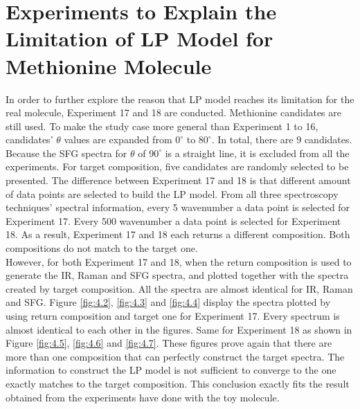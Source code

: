 
\section{Experiments to Explain the Limitation of LP Model for Methionine Molecule}

In order to further explore the reason that LP model reaches its limitation for the real molecule, Experiment 17 and 18 are conducted. Methionine candidates are still used. To make the study case more general than Experiment 1 to 16, candidates' $\theta$ values are expanded from $0^{\circ}$ to $80^{\circ}$. In total, there are $9$ candidates. Because the SFG spectra for $\theta$ of $90^{\circ}$ is a straight line, it is excluded from all the experiments. For target composition, five candidates are randomly selected to be presented. The difference between Experiment 17 and 18 is that different amount of data points are selected to build the LP model. From all three spectroscopy techniques' spectral information, every 5 wavenumber a data point is selected for Experiment 17. Every 500 wavenumber a data point is selected for Experiment 18. As a result, Experiment 17 and 18 each returns a different composition. Both compositions do not match to the target one. \\

However, for both Experiment 17 and 18, when the return composition is used to generate the IR, Raman and SFG spectra, and plotted together with the spectra created by target composition. All the spectra are almost identical for IR, Raman and SFG. Figure \ref{fig:4.2}, \ref{fig:4.3} and \ref{fig:4.4} display the spectra plotted by using return composition and target one for Experiment 17. Every spectrum is almost identical to each other in the figures. Same for Experiment 18 as shown in Figure \ref{fig:4.5}, \ref{fig:4.6} and \ref{fig:4.7}. These figures prove again that there are more than one composition that can perfectly construct the target spectra. The information to construct the LP model is not sufficient to converge to the one exactly matches to the target composition. This conclusion exactly fits the result obtained from the experiments have done with the toy molecule.\\

